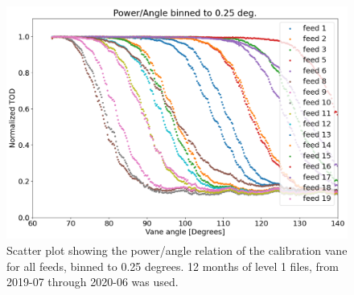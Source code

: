 \documentclass[10pt, a4paper]{article}
\begin{document}
\vspace{1cm}
\begin{figure}[h!]
    \centering
    \includegraphics[scale=0.4]{../plots/binned_all.png}
    \caption{Scatter plot showing the power/angle relation of the calibration vane for all feeds, binned to 0.25 degrees. 12 months of level 1 files, from 2019-07 through 2020-06 was used.}
    \label{fig:binned_all}
\end{figure}
\end{document}
